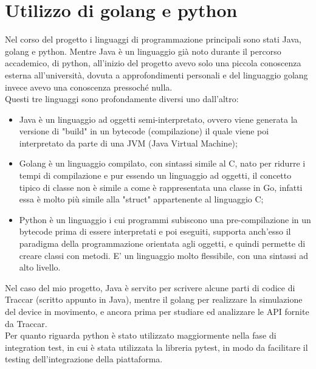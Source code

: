 \documentclass[a4paper,titlepage,12pt]{report}
\begin{document}
{\section{
Utilizzo di golang e python}
Nel corso del progetto i linguaggi di programmazione principali sono stati Java, golang e python. Mentre Java è un linguaggio già noto durante il percorso accademico, di python, all'inizio del progetto avevo solo una piccola conoscenza esterna all'università, dovuta a approfondimenti personali e del linguaggio golang invece avevo una conoscenza pressoché nulla.\\
Questi tre linguaggi sono profondamente diversi uno dall'altro:
\begin{itemize}
\item Java è un linguaggio ad oggetti semi-interpretato, ovvero viene generata la versione di "build" in un bytecode (compilazione) il quale viene poi interpretato da parte di una JVM (Java Virtual Machine); 
\item Golang è un linguaggio compilato, con sintassi simile al C, nato per ridurre i tempi di compilazione e pur essendo un linguaggio ad oggetti, il concetto tipico di classe non è simile a come è rappresentata una classe in Go, infatti essa è molto più simile alla "struct" appartenente al linguaggio C; 
\item Python è un linguaggio i cui programmi subiscono una pre-compilazione in un bytecode prima di essere interpretati e poi eseguiti, supporta anch'esso il paradigma della programmazione orientata agli oggetti, e quindi permette di creare classi con metodi. E' un linguaggio molto flessibile, con una sintassi ad alto livello.
\end{itemize} 

Nel caso del mio progetto, Java è servito per scrivere alcune parti di codice di Traccar (scritto appunto in Java), mentre il golang per realizzare la simulazione del device in movimento, e ancora prima per studiare ed analizzare le API fornite da Traccar.\\
Per quanto riguarda python è stato utilizzato maggiormente nella fase di integration test, in cui è stata utilizzata la libreria pytest, in modo da facilitare il testing dell'integrazione della piattaforma.

}
\end{document}
